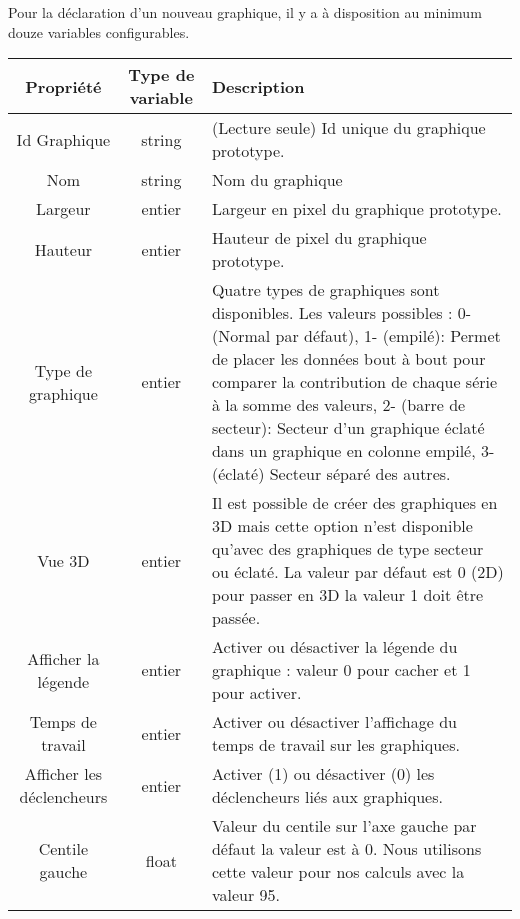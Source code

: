 		Pour la déclaration d'un nouveau graphique, il y a à disposition au minimum douze variables configurables.\\

		\begin{tabular}{|c|c|m{9cm}|}
\hline
\bf Propriété & \bf Type de variable & \bf Description \\

\hline
Id Graphique & string & (Lecture seule) Id unique du graphique prototype. \\

\hline
Nom & string & Nom du graphique \\

\hline
Largeur & entier & Largeur en pixel du graphique prototype. \\

\hline
Hauteur & entier & Hauteur de pixel du graphique prototype. \\

\hline
Type de graphique & entier & Quatre types de graphiques sont disponibles. Les valeurs possibles :  0- (Normal par défaut), 1- (empilé): Permet de placer les données bout à bout pour comparer la contribution de chaque série à la somme des valeurs, 2- (barre de secteur): Secteur d'un graphique éclaté dans un graphique en colonne empilé, 3- (éclaté) Secteur séparé des autres. \\

\hline
Vue 3D & entier & Il est possible de créer des graphiques en 3D mais cette option n'est disponible qu'avec des graphiques de type secteur ou éclaté. La valeur par défaut est 0 (2D) pour passer en 3D la valeur 1 doit être passée. \\

\hline
Afficher la légende & entier & Activer ou désactiver la légende du graphique : valeur 0 pour cacher et 1 pour activer. \\

\hline
Temps de travail & entier & Activer ou désactiver l'affichage du temps de travail sur les graphiques. \\

\hline
Afficher les déclencheurs & entier & Activer (1) ou désactiver (0) les déclencheurs liés aux graphiques. \\ 

\hline
Centile gauche & float & Valeur du centile sur l'axe gauche par défaut la valeur est à 0. Nous utilisons cette valeur pour nos calculs avec la valeur 95. \\


\end{tabular}

